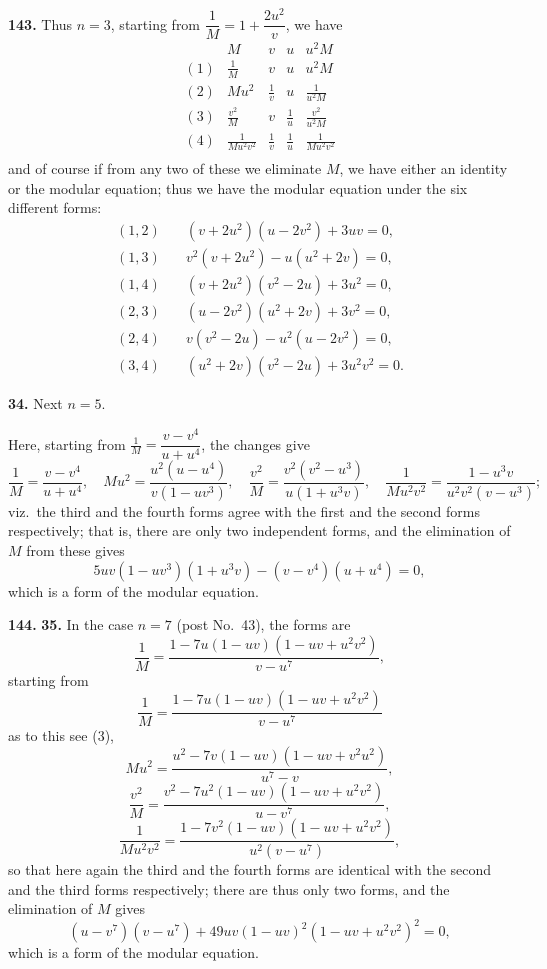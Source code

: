 \documentclass[11pt,a4paper]{article}
\theoremstyle{plain}
\begin{document}
\medskip
\noindent\textbf{143.} Thus $n = 3$, starting from $\dfrac{1}{M} = 1 + \dfrac{2u^2}{v}$, we have
\[
\begin{array}{c|cccc}
& M & v & u & u^2M \\
\hline
(1) & \frac{1}{M} & v & u & u^2M \\
(2) & Mu^2 & \frac{1}{v} & u & \frac{1}{u^2M} \\
(3) & \frac{v^2}{M} & v & \frac{1}{u} & \frac{v^2}{u^2M} \\
(4) & \frac{1}{Mu^2v^2} & \frac{1}{v} & \frac{1}{u} & \frac{1}{Mu^2v^2} \\
\end{array}
\]
and of course if from any two of these we eliminate $M$, we have either an identity or the modular equation; thus we have the modular equation under the six different forms:
\begin{align*}
(1, 2)\quad &(v + 2u^2)(u - 2v^2) + 3uv = 0, \\
(1, 3)\quad &v^2(v + 2u^2) - u(u^2 + 2v) = 0, \\
(1, 4)\quad &(v + 2u^2)(v^2 - 2u) + 3u^2 = 0, \\
(2, 3)\quad &(u - 2v^2)(u^2 + 2v) + 3v^2 = 0, \\
(2, 4)\quad &v(v^2 - 2u) - u^2(u - 2v^2) = 0, \\
(3, 4)\quad &(u^2 + 2v)(v^2 - 2u) + 3u^2v^2 = 0.
\end{align*}

\medskip
\noindent\textbf{34.} Next $n = 5$.

Here, starting from $\frac{1}{M} = \dfrac{v - v^4}{u + u^4}$, the changes give
\[
\frac{1}{M} = \frac{v - v^4}{u + u^4}, \quad
Mu^2 = \frac{u^2(u - u^4)}{v(1 - uv^3)}, \quad
\frac{v^2}{M} = \frac{v^2(v^2 - u^3)}{u(1 + u^3v)}, \quad
\frac{1}{Mu^2v^2} = \frac{1 - u^3v}{u^2v^2(v - u^3)};
\]
viz.\ the third and the fourth forms agree with the first and the second forms respectively; that is, there are only two independent forms, and the elimination of $M$ from these gives
\[
5uv(1 - uv^3)(1 + u^3v) - (v - v^4)(u + u^4) = 0,
\]
which is a form of the modular equation.


\noindent\textbf{144.} \textbf{35.} In the case $n = 7$ (post No.~43), the forms are
\[
\frac{1}{M} = \frac{1 - 7u(1 - uv)(1 - uv + u^2v^2)}{v - u^7},
\]
starting from
\[
\frac{1}{M} = \frac{1 - 7u(1 - uv)(1 - uv + u^2v^2)}{v - u^7}
\]
as to this see (3),
\[
Mu^2 = \frac{u^2 - 7v(1 - uv)(1 - uv + v^2u^2)}{u^7 - v},
\]
\[
\frac{v^2}{M} = \frac{v^2 - 7u^2(1 - uv)(1 - uv + u^2v^2)}{u - v^7},
\]
\[
\frac{1}{Mu^2v^2} = \frac{1 - 7v^2(1 - uv)(1 - uv + u^2v^2)}{u^2(v - u^7)},
\]
so that here again the third and the fourth forms are identical with the second and the third forms respectively; there are thus only two forms, and the elimination of $M$ gives
\[
(u - v^7)(v - u^7) + 49uv(1 - uv)^2(1 - uv + u^2v^2)^2 = 0,
\]
which is a form of the modular equation.
\end{document}
